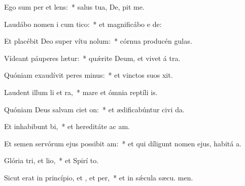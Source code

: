 \item Ego sum per et lens:~* salus tua, De, pit me.
\item Laudábo nomen i cum tico:~* et magnificábo e  de:
\item Et placébit Deo super vítu nolum:~* córnua producén  gulas.
\item Vídeant páuperes  lætur:~* quǽrite Deum, et vivet á tra.
\item Quóniam exaudívit peres minus:~* et vinctos suos  xit.
\item Laudent illum li et ra,~* mare et ómnia reptíli  is.
\item Quóniam Deus salvam ciet on:~* et ædificabúntur civi da.
\item Et inhabibunt bi,~* et hereditáte ac am.
\item Et semen servórum ejus possibit am:~* et qui díligunt nomen ejus, habitá  a.
\item Glória tri, et lio,~* et Spirí to.
\item Sicut erat in princípio, et , et per,~* et in sǽcula sæcu. men.
